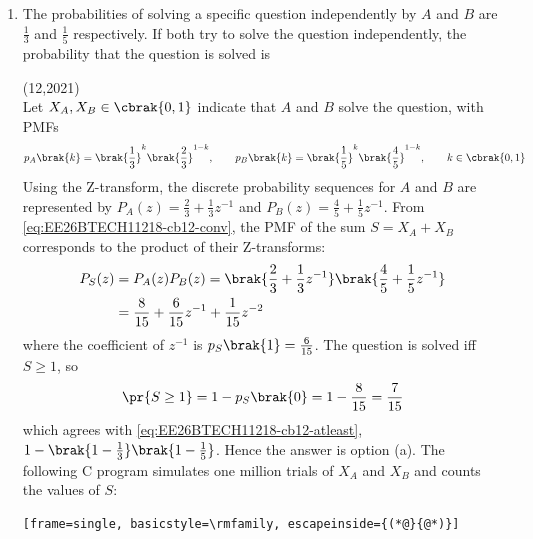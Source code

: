 \providecommand{\cbxiiyear}{2021}
\begin{enumerate}[label=\thesubsection.\arabic*, ref=\thesubsection.\theenumi,itemsep=1.5em]

\item The probabilities of solving a specific question independently by $A$ and $B$ are $\frac{1}{3}$ and $\frac{1}{5}$ respectively. If both try to solve the question independently, the probability that the question is solved is
\begin{enumerate}[label=\alph*), itemsep=0pt]
\end{enumerate}
\hfill (12,\cbxiiyear)
\\
\solution
Let $X_A,X_B\in\cbrak{0,1}$ indicate that $A$ and $B$ solve the question, with PMFs
\begin{align}
p_A\brak{k} = \brak{\frac{1}{3}}^k\brak{\frac{2}{3}}^{1-k}, \qquad p_B\brak{k} = \brak{\frac{1}{5}}^k\brak{\frac{4}{5}}^{1-k}, \qquad k\in\cbrak{0,1}
\end{align}
Using the Z-transform, the discrete probability sequences for $A$ and $B$ are represented by $P_A(z) = \frac{2}{3} + \frac{1}{3}z^{-1}$ and $P_B(z) = \frac{4}{5} + \frac{1}{5}z^{-1}$. From \eqref{eq:EE26BTECH11218-cb12-conv}, the PMF of the sum $S=X_A+X_B$ corresponds to the product of their Z-transforms:
\begin{align}
P_S(z) &= P_A(z)P_B(z) = \brak{\frac{2}{3} + \frac{1}{3}z^{-1}}\brak{\frac{4}{5} + \frac{1}{5}z^{-1}} \\
&= \frac{8}{15} + \frac{6}{15}z^{-1} + \frac{1}{15}z^{-2}
\end{align}
where the coefficient of $z^{-1}$ is $p_S\brak{1} = \frac{6}{15}$. The question is solved iff $S\ge1$, so
\begin{align}
\pr{S\ge1} = 1-p_S\brak{0} = 1-\frac{8}{15} = \frac{7}{15}
\end{align}
which agrees with \eqref{eq:EE26BTECH11218-cb12-atleast}, $1-\brak{1-\frac{1}{3}}\brak{1-\frac{1}{5}}$. Hence the answer is option (a).
The following C program simulates one million trials of $X_A$ and $X_B$ and counts the values of $S$:
\begin{lstlisting}[frame=single, basicstyle=\rmfamily, escapeinside={(*@}{@*)}]

\end{lstlisting}
\end{enumerate}
